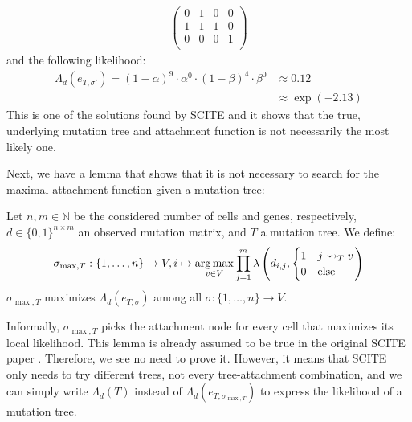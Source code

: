 \begin{example}
\begin{align*}
\begin{pmatrix}
            0 & 1 & 0 & 0 \\
            1 & 1 & 1 & 0 \\
            0 & 0 & 0 & 1 \\
        \end{pmatrix}
    \end{align*}
    and the following likelihood:
    \begin{align*}
        \Lambda_d(e_{T, \sigma'}) = (1-\alpha)^{9} \cdot \alpha^{0} \cdot (1-\beta)^{4} \cdot \beta^{0} &\approx 0.12 \\
        &\approx \exp(-2.13) 
    \end{align*}
    This is one of the solutions found by \ac{SCITE} and it shows that the true, underlying mutation tree and attachment function is not necessarily the most likely one.
\end{example}

Next, we have a lemma that shows that it is not necessary to search for the maximal attachment function given a mutation tree:

\begin{lemma}
    \label{lem:max_attachment}
    Let $n, m \in \mathbb{N}$ be the considered number of cells and genes, respectively, $d \in \{0,1\}^{n \times m}$ an observed mutation matrix, and $T$ a mutation tree. We define:
    \begin{align*}
        \sigma_{\max, T}: \{1, \dots, n\} \rightarrow V, i \mapsto \operatorname*{arg\,max}_{v \in V} \prod_{j = 1}^m \lambda \left(d_{i,j}, \begin{cases}
            1 & j \leadsto_T v \\
            0 & \mathrm{else} \\
        \end{cases}\right)
    \end{align*}
    $\sigma_{\max, T}$ maximizes $\Lambda_d (e_{T, \sigma})$ among all $\sigma: \{1, \dots, n\} \rightarrow V$.
\end{lemma}

Informally, $\sigma_{\max, T}$ picks the attachment node for every cell that maximizes its local likelihood. This lemma is already assumed to be true in the original SCITE paper \cite{tree2016}. Therefore, we see no need to prove it. However, it means that SCITE only needs to try different trees, not every tree-attachment combination, and we can simply write $\Lambda_d(T)$ instead of $\Lambda_d(e_{T, \sigma_{\max, T}})$ to express the likelihood of a mutation tree. 

